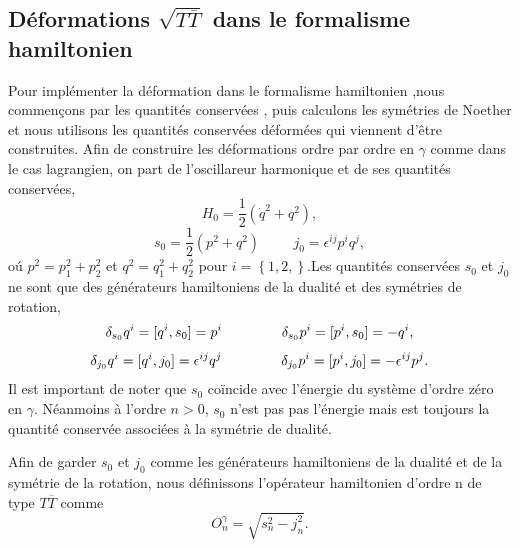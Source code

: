 \documentclass[12pt,a4paper, openany]{report}
\begin{document}
	\subsection{Déformations $\sqrt{T{\overline{T}}}$ dans le formalisme hamiltonien}\par Pour implémenter la déformation dans le formalisme hamiltonien ,nous commençons par les quantités conservées , puis calculons les symétries de Noether et nous utilisons les quantités conservées déformées qui viennent d'\^{e}tre construites. Afin de construire les déformations ordre par ordre en $\gamma$ comme dans le cas lagrangien, on part de l'oscillareur harmonique et de ses quantités conservées,
	\begin{equation}
		H_0=\frac{1}{2}\left(\dot{q}^{2}+q^{2}\right),
	\end{equation}
	\begin{equation}
		s_0=\frac{1}{2}\left({p}^{2}+q^{2}\right) \hspace{1cm} j_0=\epsilon^{ij}p^iq^j,
	\end{equation}
	o\'{u} $p^2=p^2_1+p^2_2$\hspace{0.5cm} et\hspace{0.5cm} $q^2=q^2_1+q^2_2 $ \hspace{0.5cm} pour\hspace{0.2cm}  $i=\left\{1,2,\right\} $.Les quantités conservées $s_0$ et $j_0$ ne sont que des générateurs hamiltoniens de la dualité  et des symétries de rotation,
	\begin{equation}
		\delta_{s_0}q^i=[q^i,s_0]=p^i \hspace{1.5cm} \delta_{s_0}p^i=[p^i,s_0]=-q^i,   
	\end{equation}
	\begin{equation}
		\delta_{j_0}q^i=[q^i,j_0]=\epsilon^{ij}q^j \hspace{1.5cm}  \delta_{j_0}p^i=[p^i,j_0]=-\epsilon^{ij}p^j .
	\end{equation}
	Il est important de noter que $s_0$ coïncide avec l'énergie du système d'ordre zéro en $\gamma$. Néanmoins à l'ordre $n>0$, $s_0$ n'est pas pas l'énergie mais est toujours la quantité conservée associées à la symétrie de dualité.\par Afin de garder $s_0$ et $j_0$ comme les générateurs hamiltoniens de la dualité et de la symétrie de la rotation, nous définissons l'opérateur hamiltonien d'ordre n de type $T{\overline{T}}$ comme 
	\begin{equation}
		O^{\gamma}_n=\sqrt{s^2_n-j^2_n} .	
	\end{equation}
\end{document}
